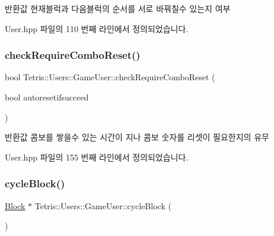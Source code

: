 \begin{DoxyReturn}{반환값}
현재블럭과 다음블럭의 순서를 서로 바꿔칠수 있는지 여부 
\end{DoxyReturn}


User.\+hpp 파일의 110 번째 라인에서 정의되었습니다.

\mbox{\label{class_tetris_1_1_users_1_1_game_user_a82ea0dfdb99643a1b577a22f5e504346}} 
\subsubsection{\texorpdfstring{check\+Require\+Combo\+Reset()}{checkRequireComboReset()}}
{\footnotesize\ttfamily bool Tetris\+::\+Users\+::\+Game\+User\+::check\+Require\+Combo\+Reset (\begin{DoxyParamCaption}\item[{bool}]{autoresetifsucceed }\end{DoxyParamCaption})\hspace{0.3cm}{\ttfamily [inline]}}

\begin{DoxyReturn}{반환값}
콤보를 쌓을수 있는 시간이 지나 콤보 숫자를 리셋이 필요한지의 유무 
\end{DoxyReturn}


User.\+hpp 파일의 155 번째 라인에서 정의되었습니다.

\mbox{\label{class_tetris_1_1_users_1_1_game_user_a5efbd1ed9fa84a4041c218fb32463c36}} 
\subsubsection{\texorpdfstring{cycle\+Block()}{cycleBlock()}\hspace{0.1cm}{\footnotesize\ttfamily [1/2]}}
{\footnotesize\ttfamily \hyperlink{class_tetris_1_1_block}{Block} $\ast$ Tetris\+::\+Users\+::\+Game\+User\+::cycle\+Block (\begin{DoxyParamCaption}{ }\end{DoxyParamCaption})}



